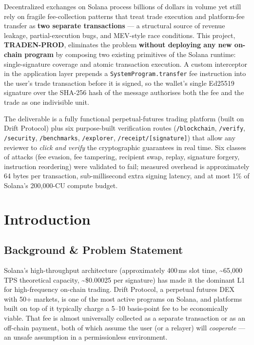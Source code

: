 \documentclass[11pt,a4paper]{article}
\begin{document}
Decentralized exchanges on Solana process billions of dollars in volume yet still rely on fragile fee-collection patterns that treat trade execution and platform-fee transfer as \textbf{two separate transactions} --- a structural source of revenue leakage, partial-execution bugs, and MEV-style race conditions. This project, \textbf{TRADEN-PROD}, eliminates the problem \textbf{without deploying any new on-chain program} by composing two existing primitives of the Solana runtime: single-signature coverage and atomic transaction execution. A custom interceptor in the application layer prepends a \texttt{SystemProgram.transfer} fee instruction into the user's trade transaction before it is signed, so the wallet's single Ed25519 signature over the SHA-256 hash of the message authorises both the fee and the trade as one indivisible unit.

The deliverable is a fully functional perpetual-futures trading platform (built on Drift Protocol) plus six purpose-built verification routes (\texttt{/blockchain}, \texttt{/verify}, \texttt{/security}, \texttt{/benchmarks}, \texttt{/explorer}, \texttt{/receipt/[signature]}) that allow any reviewer to \textit{click and verify} the cryptographic guarantees in real time. Six classes of attacks (fee evasion, fee tampering, recipient swap, replay, signature forgery, instruction reordering) were validated to fail; measured overhead is approximately 64 bytes per transaction, sub-millisecond extra signing latency, and at most 1\% of Solana's 200{,}000-CU compute budget.

\section{Introduction}

\subsection{Background \& Problem Statement}

Solana's high-throughput architecture (approximately 400\,ms slot time, \textasciitilde65{,}000 TPS theoretical capacity, \textasciitilde\$0.00025 per signature) has made it the dominant L1 for high-frequency on-chain trading. Drift Protocol, a perpetual futures DEX with 50+ markets, is one of the most active programs on Solana, and platforms built on top of it typically charge a 5--10 basis-point fee to be economically viable. That fee is almost universally collected as a separate transaction or as an off-chain payment, both of which assume the user (or a relayer) will \textit{cooperate} --- an unsafe assumption in a permissionless environment.
\end{document}
